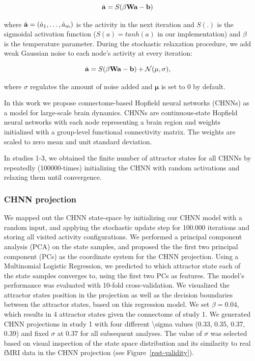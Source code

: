 \documentclass{article}
\begin{document}
\begin{equation}
\label{hopfield-update-matrix}
\dot{\bold{a}} = S(\beta \bold{W} \bold{a} - \bold{b})
\end{equation}

where $\dot{\bold{a}} = (\dot{a}_1, \dots, \dot{a}_m)$ is the activity in the next iteration and $S(.)$ is the sigmoidal activation function ($S(a) = tanh(a)$ in our implementation) and $\beta$ is the temperature parameter.
During the stochastic relaxation procedure, we add weak Gaussian noise to each node's activity at every iteration:

\begin{equation}
\label{hopfield-update-matrix-stochastic}
\dot{\bold{a}} = S(\beta \bold{W} \bold{a} - \bold{b}) + \mathcal{N}(\mathbf{\mu}, \sigma),
\end{equation}

where $\sigma$ regulates the amount of noise added and $\mathbf{\mu}$ is set to 0 by default.

In this work we propose connectome-based Hopfield neural networks (CHNNs) as a model for large-scale brain dynamics. CHNNs are continuous-state Hopfield neural networks with each node representing a brain region and weights initialized with a group-level functional connectivity matrix. The weights are scaled to zero mean and unit standard deviation.

In studies 1-3, we obtained the finite number of attractor states for all CHNNs by repeatedly (100000-times) initializing the CHNN with random activations and relaxing them until convergence.

\subsubsection{CHNN projection}\label{CHNN projection}

We mapped out the CHNN state-space by initializing our CHNN model with a random input, and applying the stochastic update step for 100.000 iterations and storing all visited activity configurations.
We performed a principal component analysis (PCA) on the state samples, and proposed the the first two principal  component (PCs) as the coordinate system for the CHNN projection. Using a Multinomial Logistic Regression, we predicted to which attractor state each of the state samples converges to, using the first two PCs as features. The model's performance was evaluated with 10-fold cross-validation. We visualized the attractor states position in the projection as well as the decision boundaries between the attractor states, based on this regression model. We set $\beta = 0.04$, which results in 4 attractor states given the connectome of study 1. We  generated CHNN projections in study 1 with four different {\textbackslash}sigma values (0.33, 0.35, 0.37, 0.39) and fixed $\sigma$ at 0.37 for all subsequent analyses. The value of $\sigma$ was selected based on visual inspection of the state space distribution and its similarity to real fMRI data in the CHNN projection (see Figure~\ref{rest-validity}).
\end{document}
